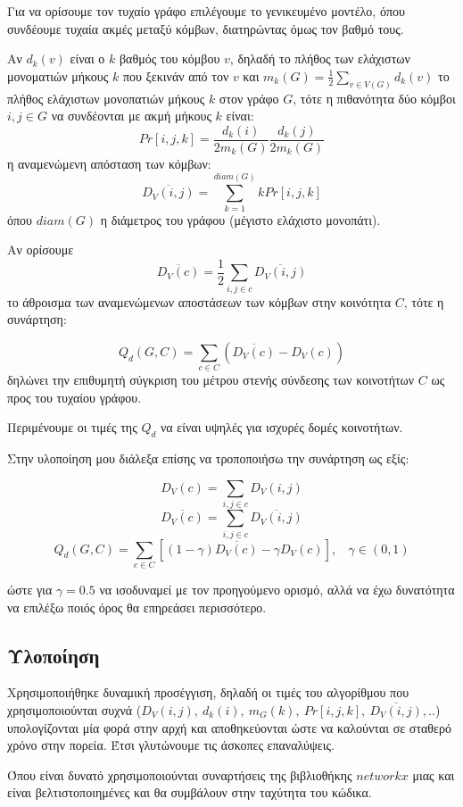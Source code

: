 \documentclass[10pt, letterpaper]{article}
\begin{document}
Για να ορίσουμε τον τυχαίο γράφο επιλέγουμε το γενικευμένο μοντέλο,
όπου συνδέουμε τυχαία ακμές μεταξύ κόμβων, διατηρώντας όμως τον βαθμό τους.


Αν $d_k(v)$ είναι ο $k$ βαθμός του κόμβου $v$, δηλαδή το πλήθος των 
ελάχιστων μονοματιών μήκους $k$ που ξεκινάν από τον $v$ και 
$m_k(G) = \frac{1}{2} \sum_{v \in V (G)} d_k(v)$ το πλήθος 
ελάχιστων μονοπατιών μήκους $k$ στον γράφο $G$, τότε η πιθανότητα δύο κόμβοι
$i,j \in G$ να συνδέονται με ακμή μήκους $k$ είναι:
\[ Pr[i,j,k] = \frac{d_k(i)}{2m_k(G)} \frac{d_k(j)}{2m_k(G)} \]
η αναμενώμενη απόσταση των κόμβων:
\[ \overline{D_V(i,j)} = \sum_{k=1}^{diam(G)} k Pr[i,j,k] \]
όπου $diam(G)$ η διάμετρος του γράφου (μέγιστο ελάχιστο μονοπάτι).

Αν ορίσουμε
\[ \overline{ D_V(c)  } = \frac{1}{2} \sum_{i,j \in c} \overline{ D_V(i,j) }\]
το άθροισμα των αναμενώμενων αποστάσεων των κόμβων στην κοινότητα $C$, 
τότε η συνάρτηση:

\[ Q_d(G,C) = \sum_{c \in C} (\overline{ D_V(c) } - D_V(c))\]
δηλώνει την επιθυμητή σύγκριση του μέτρου στενής σύνδεσης των κοινοτήτων 
$C$ ως προς του τυχαίου γράφου. 

Περιμένουμε οι τιμές της $Q_d$ να είναι υψηλές για ισχυρές δομές κοινοτήτων.


Στην υλοποίηση μου διάλεξα επίσης να τροποποιήσω την συνάρτηση ως εξίς:

\[ D_V(c) = \sum_{i,j \in c} D_V(i,j) \]
\[ \overline{ D_V(c)  } =  \sum_{i,j \in c} \overline{ D_V(i,j) }\]
\[ Q_d(G,C) = \sum_{c \in C} [(1 - \gamma)\overline{ D_V(c) } - \gamma D_V(c) ],  \ \ \ \ \gamma \in (0,1)\]

ώστε για $\gamma = 0.5$ να ισοδυναμεί με τον προηγούμενο ορισμό, αλλά να έχω 
δυνατότητα να επιλέξω ποιός όρος θα επηρεάσει περισσότερο.



\subsection{Υλοποίηση}  \label{ylop}


Χρησιμοποιήθηκε δυναμική προσέγγιση, δηλαδή οι τιμές του αλγορίθμου που χρησιμοποιούνται 
συχνά ($D_V(i,j), \ d_k(i), \ m_G(k), \ Pr[i,j,k],  \ \overline{D_V(i,j)},..$)
υπολογίζονται μία φορά στην αρχή και αποθηκεύονται ώστε να καλούνται σε σταθερό χρόνο στην πορεία. Έτσι γλυτώνουμε τις 
άσκοπες επαναλύψεις. 

Όπου είναι δυνατό χρησιμοποιούνται συναρτήσεις της βιβλιοθήκης $networkx$ μιας και 
είναι βελτιστοποιημένες και θα συμβάλουν στην ταχύτητα του κώδικα.
\end{document}
